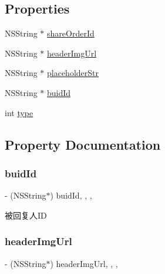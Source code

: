 \subsection*{Properties}
\begin{DoxyCompactItemize}
\item 
N\+S\+String $\ast$ \mbox{\hyperlink{interface_comment_view_controller_a4c8d06cdfef003534a8402bd5e7df9a5}{share\+Order\+Id}}
\item 
N\+S\+String $\ast$ \mbox{\hyperlink{interface_comment_view_controller_af2c9e876114ee6d5bae4873a1835dcc3}{header\+Img\+Url}}
\item 
N\+S\+String $\ast$ \mbox{\hyperlink{interface_comment_view_controller_a921f50f2a8b4c0d8e2f7d8ddeb60fea0}{placeholder\+Str}}
\item 
N\+S\+String $\ast$ \mbox{\hyperlink{interface_comment_view_controller_ab45439562f579ac645a6cd12288dd7e8}{buid\+Id}}
\item 
int \mbox{\hyperlink{interface_comment_view_controller_a16119b437f29c6a792781f480ede668e}{type}}
\end{DoxyCompactItemize}


\subsection{Property Documentation}
\mbox{\label{interface_comment_view_controller_ab45439562f579ac645a6cd12288dd7e8}} 
\subsubsection{\texorpdfstring{buid\+Id}{buidId}}
{\footnotesize\ttfamily -\/ (N\+S\+String$\ast$) buid\+Id\hspace{0.3cm}{\ttfamily [read]}, {\ttfamily [write]}, {\ttfamily [nonatomic]}, {\ttfamily [strong]}}

被回复人\+ID \mbox{\label{interface_comment_view_controller_af2c9e876114ee6d5bae4873a1835dcc3}} 
\subsubsection{\texorpdfstring{header\+Img\+Url}{headerImgUrl}}
{\footnotesize\ttfamily -\/ (N\+S\+String$\ast$) header\+Img\+Url\hspace{0.3cm}{\ttfamily [read]}, {\ttfamily [write]}, {\ttfamily [nonatomic]}, {\ttfamily [strong]}}

